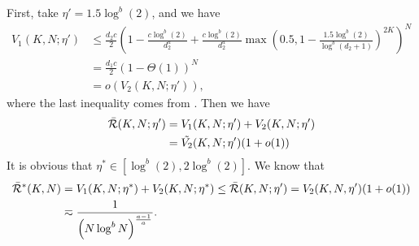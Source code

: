 First, take $\eta' = 1.5 \log^b(2)$, and we have
    \begin{align*}
        V_1(K, N; \eta') &\leq \frac{d_2c}{2}\left(1-\frac{c\log^b(2)}{d_2^{a}}+\frac{c\log^b(2)}{d_2^{a}}\max\left(0.5, 1-\frac{1.5 \log^b(2)}{\log^b(d_2 +1)}\right)^{2K}\right)^N \\
        &=\frac{d_1c}{2}\left(1-\Theta(1)\right)^N \\
        &=o(V_2(K, N;\eta')),
    \end{align*}
    where the last inequality comes from . Then we have
    \begin{align*}
        \Bar{\mathcal{R}}(K, N;\eta')&=V_1(K, N;\eta')+V_2(K, N;\eta') \\
        &=\Tilde{V_2}(K, N;\eta')(1+o(1)) 
    \end{align*}
    It is obvious that $\eta^* \in \left[\log^b(2), 2\log^b(2)\right]$. We know that
    \begin{align*}
        \Bar{\mathcal{R}}^*(K, N)&=V_1(K, N;\eta^*)+V_2(K, N;\eta^*) \leq\Bar{\mathcal{R}}(K, N;\eta')=V_2(K, N, \eta')(1+o(1)) \\
        &\eqsim \frac{1}{\left(N\log^b N\right)^{\frac{a-1}{a}}}.
    \end{align*}
